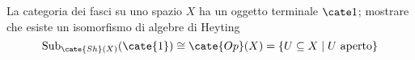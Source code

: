 \begin{MyExercise}
La categoria dei fasci su uno spazio $X$ ha un oggetto terminale $\cate 1$; mostrare che esiste un isomorfismo di algebre di Heyting 
\[
\text{Sub}_{\cate{Sh}(X)}(\cate{1})\cong \cate{Op}(X) = \{ U\subseteq X\mid U \text{ aperto}\}
\]
\end{MyExercise}
